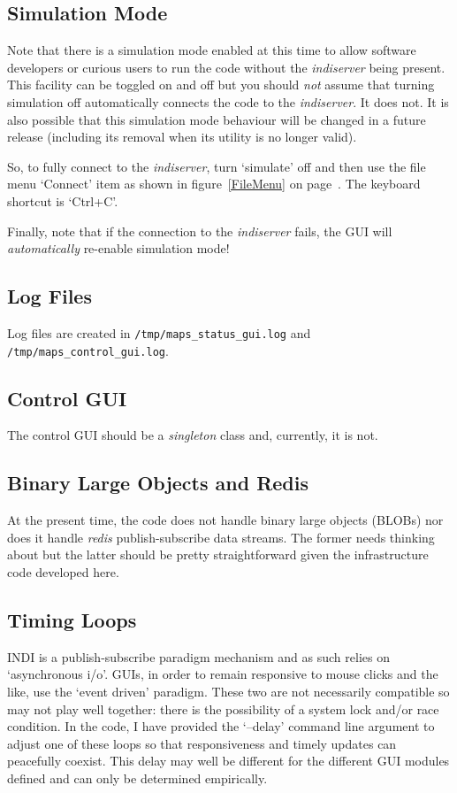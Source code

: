 \documentclass[12pt,twoside]{article}
\begin{document}
\subsection{Simulation Mode}
\label{Simulation Mode}
Note that there is a simulation mode enabled at this time to allow software developers or curious users to 
run the code without the \emph{indiserver} being present. This facility can be toggled on and off
but you should \emph{not} assume that turning simulation off automatically connects the code to the
\emph{indiserver}. It does not. It is also possible that this simulation mode behaviour will be changed
in a future release (including its removal when its utility is no longer valid).

So, to fully connect to the \emph{indiserver}, turn `simulate' off and then use the file menu `Connect' item
as shown in figure~\ref{FileMenu} on page~\pageref{FileMenu}. The keyboard shortcut is `Ctrl+C'.

Finally, note that if the connection to the \emph{indiserver} fails, the GUI will \emph{automatically}
re-enable simulation mode!

\subsection{Log Files}
\label{Log Files}
Log files are created in {\tt /tmp/maps\_status\_gui.log} and {\tt /tmp/maps\_control\_gui.log}.

\subsection{Control GUI}
\label{Control GUI}
The control GUI should be a \emph{singleton} class and, currently, it is not.

\subsection{Binary Large Objects and Redis}
\label{Binary Large Objects and Redis}

At the present time, the code does not handle binary large objects (BLOBs) nor does it handle \emph{redis} publish-subscribe
data streams. The former needs thinking about but the latter should be pretty straightforward given the infrastructure code
developed here.

\subsection{Timing Loops}
\label{Timing Loops}
INDI is a publish-subscribe paradigm mechanism and as such relies on `asynchronous i/o'. GUIs, in order to remain responsive to
mouse clicks and the like, use the `event driven' paradigm. These two are not necessarily compatible so may not play well together: 
there is the possibility of a system lock and/or race condition. In the code, I have provided the `--delay' command line argument to 
adjust one of these loops so that responsiveness and timely updates can peacefully coexist. This delay may well be different for the 
different GUI modules defined and can only be determined empirically.
\end{document}
